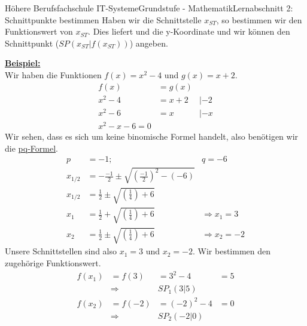 \documentclass[11pt,twocolumn,oneside,openany,headings=optiontotoc,11pt,numbers=noenddot]{article}
\begin{document}
\begin{worksheet}{Höhere Berufsfachschule IT-Systeme}{Grundstufe - Mathematik}{Lernabschnitt 2: Schnittpunkte bestimmen}
		Haben wir die Schnittstelle \(x_{ST}\), so bestimmen wir den Funktionswert von \(x_{ST}\). Dies liefert und die y-Koordinate und wir können den Schnittpunkt (\(SP(x_{ST}|f(x_{ST}))\)) angeben.
		\par\noindent
		\underline{\textbf{Beispiel:}}\\
		Wir haben die Funktionen \(f(x) = x^2 - 4\) und \(g(x) = x+2\).\\
		\begin{align*}
			f(x) & = g(x)\\
			x^2 - 4 & = x + 2 & | -2\\
			x^2 - 6 & = x & | -x\\
			x^2 -x -6 = 0
		\end{align*}
		Wir sehen, dass es sich um keine binomische Formel handelt, also benötigen wir die \underline{pq-Formel}.
		\begin{align*}
			p & = -1; & q = - 6\\
			x_{1/2} & = -\frac{-1}{2} \pm \sqrt{\left(\frac{-1}{2}\right)^2 - (-6)}\\
			x_{1/2} & = \frac{1}{2} \pm \sqrt{\left(\frac{1}{4}\right) + 6}\\
			x_1 & = \frac{1}{2} + \sqrt{\left(\frac{1}{4}\right) + 6} & \Rightarrow x_1 = 3\\
			x_2 & = \frac{1}{2} \pm \sqrt{\left(\frac{1}{4}\right) + 6} & \Rightarrow x_2 = -2
		\end{align*}
		Unsere Schnittstellen sind also \colorbox{green!10}{\(x_1 = 3\)} und \colorbox{green!10}{\(x_2 = -2\)}. Wir bestimmen den zugehörige Funktionswert.\\
		\begin{align*}
			f(x_1) & = f(3)  & = 3^2 - 4  & = 5\\
			& \Rightarrow & SP_1(3|5) & \\
			f(x_2) & = f(-2) & = (-2)^2 - 4 & = 0\\
			& \Rightarrow & SP_2(-2|0) &
		\end{align*}
	\end{worksheet}
\end{document}

